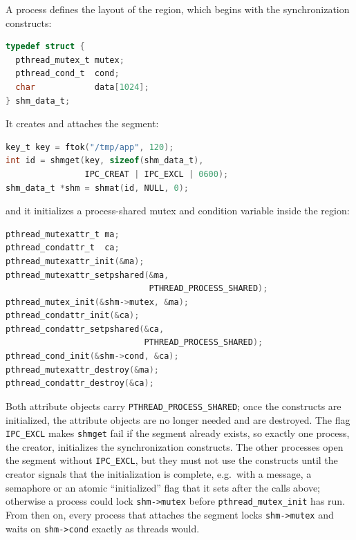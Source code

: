 \documentclass[../main.tex]{subfiles}
\begin{document}
\begin{example}
  \label{ex:l09-pshared}
  A process defines the layout of the region, which begins with the
  synchronization constructs:
  \begin{lstlisting}[language=C, numbers=none]
typedef struct {
  pthread_mutex_t mutex;
  pthread_cond_t  cond;
  char            data[1024];
} shm_data_t;
\end{lstlisting}
  It creates and attaches the segment:
  \begin{lstlisting}[language=C, numbers=none]
key_t key = ftok("/tmp/app", 120);
int id = shmget(key, sizeof(shm_data_t),
                IPC_CREAT | IPC_EXCL | 0600);
shm_data_t *shm = shmat(id, NULL, 0);
\end{lstlisting}
  and it initializes a process-shared mutex and condition variable inside
  the region:
  \begin{lstlisting}[language=C, numbers=none]
pthread_mutexattr_t ma;
pthread_condattr_t  ca;
pthread_mutexattr_init(&ma);
pthread_mutexattr_setpshared(&ma,
                             PTHREAD_PROCESS_SHARED);
pthread_mutex_init(&shm->mutex, &ma);
pthread_condattr_init(&ca);
pthread_condattr_setpshared(&ca,
                            PTHREAD_PROCESS_SHARED);
pthread_cond_init(&shm->cond, &ca);
pthread_mutexattr_destroy(&ma);
pthread_condattr_destroy(&ca);
\end{lstlisting}
  Both attribute objects carry \texttt{PTHREAD\_PROCESS\_SHARED}; once the
  constructs are initialized, the attribute objects are no longer needed
  and are destroyed.  The flag
  \texttt{IPC\_EXCL} makes \texttt{shmget} fail if the segment already
  exists, so exactly one process, the creator, initializes the
  synchronization constructs.  The other processes open the segment
  without \texttt{IPC\_EXCL}, but they must not use the constructs until
  the creator signals that the initialization is complete, e.g.\ with a
  message, a semaphore or an atomic \enquote{initialized} flag that it sets
  after the calls above; otherwise a process could lock
  \texttt{shm->mutex} before \texttt{pthread\_mutex\_init} has run.  From
  then on, every process that attaches the segment locks
  \texttt{shm->mutex} and waits on \texttt{shm->cond} exactly as threads
  would.
\end{example}
\end{document}
